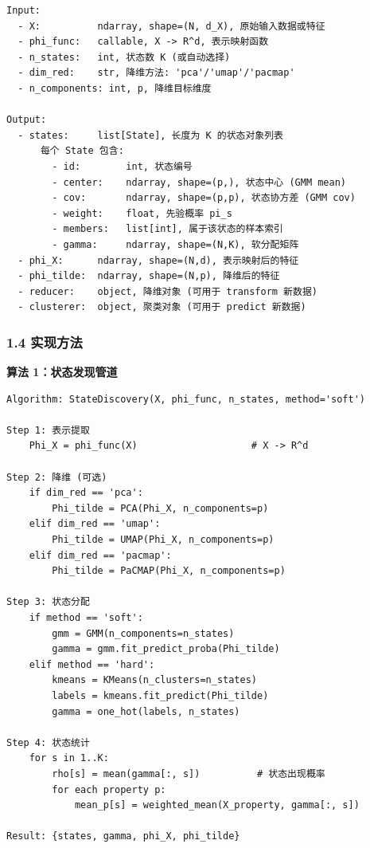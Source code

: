 \documentclass[
  12pt,
]{ctexart}
\begin{document}
\begin{verbatim}
Input:
  - X:          ndarray, shape=(N, d_X), 原始输入数据或特征
  - phi_func:   callable, X -> R^d, 表示映射函数
  - n_states:   int, 状态数 K (或自动选择)
  - dim_red:    str, 降维方法: 'pca'/'umap'/'pacmap'
  - n_components: int, p, 降维目标维度

Output:
  - states:     list[State], 长度为 K 的状态对象列表
      每个 State 包含:
        - id:        int, 状态编号
        - center:    ndarray, shape=(p,), 状态中心 (GMM mean)
        - cov:       ndarray, shape=(p,p), 状态协方差 (GMM cov)
        - weight:    float, 先验概率 pi_s
        - members:   list[int], 属于该状态的样本索引
        - gamma:     ndarray, shape=(N,K), 软分配矩阵
  - phi_X:      ndarray, shape=(N,d), 表示映射后的特征
  - phi_tilde:  ndarray, shape=(N,p), 降维后的特征
  - reducer:    object, 降维对象 (可用于 transform 新数据)
  - clusterer:  object, 聚类对象 (可用于 predict 新数据)
\end{verbatim}

\subsubsection{1.4 实现方法}\label{ux5b9eux73b0ux65b9ux6cd5}

\textbf{算法 1：状态发现管道}

\begin{verbatim}
Algorithm: StateDiscovery(X, phi_func, n_states, method='soft')

Step 1: 表示提取
    Phi_X = phi_func(X)                    # X -> R^d

Step 2: 降维 (可选)
    if dim_red == 'pca':
        Phi_tilde = PCA(Phi_X, n_components=p)
    elif dim_red == 'umap':
        Phi_tilde = UMAP(Phi_X, n_components=p)
    elif dim_red == 'pacmap':
        Phi_tilde = PaCMAP(Phi_X, n_components=p)

Step 3: 状态分配
    if method == 'soft':
        gmm = GMM(n_components=n_states)
        gamma = gmm.fit_predict_proba(Phi_tilde)
    elif method == 'hard':
        kmeans = KMeans(n_clusters=n_states)
        labels = kmeans.fit_predict(Phi_tilde)
        gamma = one_hot(labels, n_states)

Step 4: 状态统计
    for s in 1..K:
        rho[s] = mean(gamma[:, s])          # 状态出现概率
        for each property p:
            mean_p[s] = weighted_mean(X_property, gamma[:, s])

Result: {states, gamma, phi_X, phi_tilde}
\end{verbatim}
\end{document}
